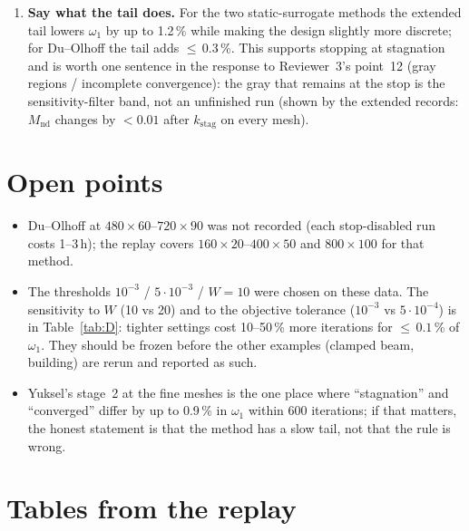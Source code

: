 \documentclass[11pt,a4paper]{article}
\newcommand{\Mnd}{M_{\mathrm{nd}}}
\newcommand{\kstag}{k_{\mathrm{stag}}}
\newcommand{\me}[2]{$#1\times#2$}
\begin{document}
\begin{enumerate}
\item \textbf{Say what the tail does.} For the two static-surrogate methods the
  extended tail lowers $\omega_1$ by up to 1.2\,\% while making the design
  slightly more discrete; for Du--Olhoff the tail adds ${\le}\,0.3$\,\%. This
  supports stopping at stagnation and is worth one sentence in the response to
  Reviewer~3's point~12 (gray regions / incomplete convergence): the gray that
  remains at the stop is the sensitivity-filter band, not an unfinished run
  (shown by the extended records: $\Mnd$ changes by $< 0.01$ after $\kstag$ on
  every mesh).
\end{enumerate}

\section{Open points}

\begin{itemize}
\item Du--Olhoff at \me{480}{60}--\me{720}{90} was not recorded (each
  stop-disabled run costs 1--3\,h); the replay covers
  \me{160}{20}--\me{400}{50} and \me{800}{100} for that method.
\item The thresholds $10^{-3}$ / $5\cdot10^{-3}$ / $W = 10$ were chosen on these
  data. The sensitivity to $W$ (10 vs 20) and to the objective tolerance
  ($10^{-3}$ vs $5\cdot10^{-4}$) is in Table~\ref{tab:D}: tighter settings cost
  10--50\,\% more iterations for ${\le}\,0.1$\,\% of $\omega_1$. They should be
  frozen before the other examples (clamped beam, building) are rerun and
  reported as such.
\item Yuksel's stage~2 at the fine meshes is the one place where
  ``stagnation'' and ``converged'' differ by up to 0.9\,\% in $\omega_1$ within
  600 iterations; if that matters, the honest statement is that the method has
  a slow tail, not that the rule is wrong.
\end{itemize}

\appendix
\section{Tables from the replay}
\end{document}
